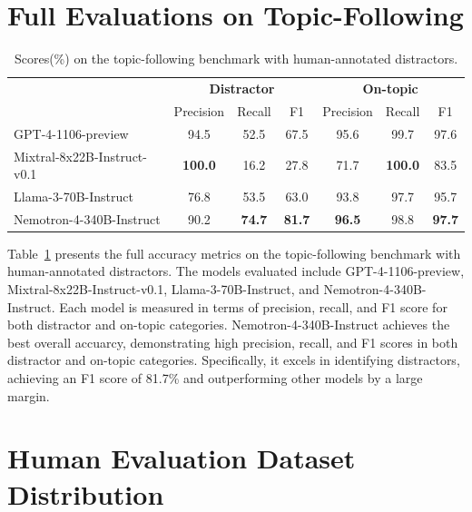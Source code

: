 \documentclass[11pt]{article}
\newcommand{\oursin}{Nemotron-4-340B-Instruct}
\begin{document}
\section{Full Evaluations on Topic-Following}
\label{sec:sup-tfeval}
\begin{table}[ht]
\centering
\begin{tabular}{@{}l|ccc|ccc@{}}
\toprule
                            & \multicolumn{3}{c}{\textbf{Distractor}} & \multicolumn{3}{c}{\textbf{On-topic}} \\ 
                            & Precision  & Recall  & F1    & Precision   & Recall  & F1     \\\midrule

GPT-4-1106-preview                 & 94.5     & 52.5   & 67.5 & 95.6       & 99.7   & 97.6  \\
Mixtral-8x22B-Instruct-v0.1             & \textbf{100.0}      & 16.2   & 27.8 & 71.7       & \textbf{100.0}   & 83.5  \\
Llama-3-70B-Instruct            & 76.8          & 53.5   & 63.0  & 93.8       & 97.7      & 95.7  \\
\oursin{}                &   90.2         & \textbf{74.7}        & \textbf{81.7}     &    \textbf{96.5}         & 98.8        & \textbf{97.7}       \\
\bottomrule
\end{tabular}
\caption{Scores(\%) on the topic-following benchmark with human-annotated distractors.}
\label{tab:full-topic-following}
\end{table}

Table~\ref{tab:full-topic-following} presents the full accuracy metrics on the topic-following benchmark with human-annotated distractors. The models evaluated include GPT-4-1106-preview, Mixtral-8x22B-Instruct-v0.1, Llama-3-70B-Instruct, and \oursin{}. Each model is measured in terms of precision, recall, and F1 score for both distractor and on-topic categories. \oursin{} achieves the best overall accuarcy, demonstrating high precision, recall, and F1 scores in both distractor and on-topic categories. Specifically, it excels in identifying distractors, achieving an F1 score of 81.7\% and outperforming other models by a large margin.

\section{Human Evaluation Dataset Distribution}
\label{sec:sup-human-eval-distribution}
\end{document}

